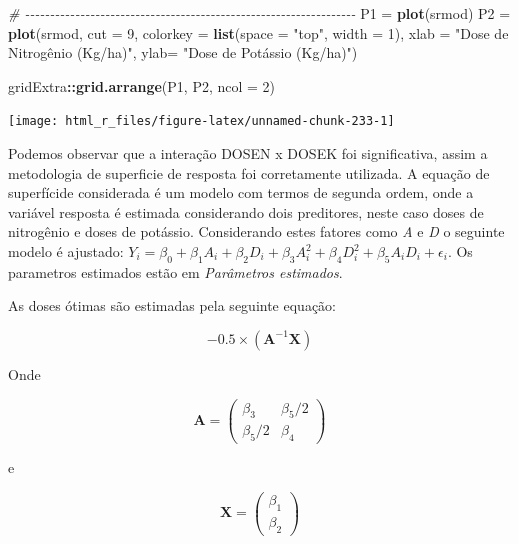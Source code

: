 \documentclass[
]{book}
\newenvironment{Shaded}{\begin{snugshade}}{\end{snugshade}}
\newcommand{\CommentTok}[1]{\textcolor[rgb]{0.56,0.35,0.01}{\textit{#1}}}
\newcommand{\DataTypeTok}[1]{\textcolor[rgb]{0.13,0.29,0.53}{#1}}
\newcommand{\DecValTok}[1]{\textcolor[rgb]{0.00,0.00,0.81}{#1}}
\newcommand{\KeywordTok}[1]{\textcolor[rgb]{0.13,0.29,0.53}{\textbf{#1}}}
\newcommand{\NormalTok}[1]{#1}
\newcommand{\OperatorTok}[1]{\textcolor[rgb]{0.81,0.36,0.00}{\textbf{#1}}}
\newcommand{\StringTok}[1]{\textcolor[rgb]{0.31,0.60,0.02}{#1}}
\numberwithin{equation}{section}
\newcommand{\indt}[1]{\index{#1|ST}}
\begin{document}
\begin{Shaded}
\begin{Highlighting}[]
\CommentTok{\# {-}{-}{-}{-}{-}{-}{-}{-}{-}{-}{-}{-}{-}{-}{-}{-}{-}{-}{-}{-}{-}{-}{-}{-}{-}{-}{-}{-}{-}{-}{-}{-}{-}{-}{-}{-}{-}{-}{-}{-}{-}{-}{-}{-}{-}{-}{-}{-}{-}{-}{-}{-}{-}{-}{-}{-}{-}{-}{-}{-}{-}{-}{-}{-}{-}{-}}
\NormalTok{P1 =}\StringTok{ }\KeywordTok{plot}\NormalTok{(srmod)}
\NormalTok{P2 =}\StringTok{ }\KeywordTok{plot}\NormalTok{(srmod, }\DataTypeTok{cut =} \DecValTok{9}\NormalTok{,}
          \DataTypeTok{colorkey =} \KeywordTok{list}\NormalTok{(}\DataTypeTok{space =} \StringTok{"top"}\NormalTok{, }\DataTypeTok{width =} \DecValTok{1}\NormalTok{),}
          \DataTypeTok{xlab =} \StringTok{"Dose de Nitrogênio (Kg/ha)"}\NormalTok{,}
          \DataTypeTok{ylab=} \StringTok{"Dose de Potássio (Kg/ha)"}\NormalTok{)}

\NormalTok{gridExtra}\OperatorTok{::}\KeywordTok{grid.arrange}\NormalTok{(P1, P2, }\DataTypeTok{ncol =} \DecValTok{2}\NormalTok{)}
\end{Highlighting}
\end{Shaded}

\begin{center}\texttt{[image: html\_r\_files/figure-latex/unnamed-chunk-233-1]} \end{center}

Podemos observar que a interação DOSEN x DOSEK foi significativa, assim a metodologia de superficie de resposta foi corretamente utilizada. A equação de superfícide considerada é um modelo com termos de segunda ordem, onde a variável resposta é estimada considerando dois preditores, neste caso doses de nitrogênio e doses de potássio. Considerando estes fatores como \emph{A} e \emph{D} o seguinte modelo é ajustado: \(Y_i = \beta_0 + \beta_1A_i+\beta_2D_i+\beta_3A_i^2+\beta_4D_i^2 +\beta_5A_iD_i+\epsilon_i\). Os parametros estimados estão em \emph{Parâmetros estimados}.

As doses ótimas são estimadas pela seguinte equação: \indt{doses ótimas}

\[
- 0.5 \times ({{\boldsymbol{A}}^{ - 1}}{\boldsymbol{X}})
\]

Onde

\[
{\boldsymbol{A}} = \left( {\begin{array}{*{20}{c}}{{\beta _3}}&{{\beta _5}/2}\\{{\beta _5}/2}&{{\beta _4}}\end{array}} \right)
\]

e

\[
{\boldsymbol{X}} = \left( \begin{array}{l}{\beta _1}\\{\beta _2}\end{array} \right)
\]
\end{document}
